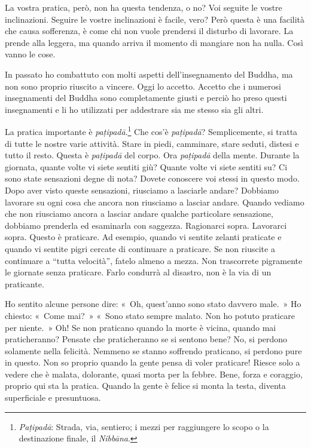 La vostra pratica, però, non ha questa tendenza, o no? Voi seguite le
vostre inclinazioni. Seguire le vostre inclinazioni è facile, vero? Però
questa è una facilità che causa sofferenza, è come chi non vuole
prendersi il disturbo di lavorare. La prende alla leggera, ma quando
arriva il momento di mangiare non ha nulla. Così vanno le cose.

In passato ho combattuto con molti aspetti dell'insegnamento del Buddha,
ma non sono proprio riuscito a vincere. Oggi lo accetto. Accetto che i
numerosi insegnamenti del Buddha sono completamente giusti e perciò ho
preso questi insegnamenti e li ho utilizzati per addestrare sia me
stesso sia gli altri.

La pratica importante è \emph{paṭipadā}.\footnote{\emph{Paṭipadā}:
  Strada, via, sentiero; i mezzi per raggiungere lo scopo o la
  destinazione finale, il \emph{Nibbāna}.} Che cos'è \emph{paṭipadā}?
Semplicemente, si tratta di tutte le nostre varie attività. Stare in
piedi, camminare, stare seduti, distesi e tutto il resto. Questa è
\emph{paṭipadā} del corpo. Ora \emph{paṭipadā} della mente. Durante la
giornata, quante volte vi siete sentiti giù? Quante volte vi siete
sentiti su? Ci sono state sensazioni degne di nota? Dovete conoscere voi
stessi in questo modo. Dopo aver visto queste sensazioni, riusciamo a
lasciarle andare? Dobbiamo lavorare su ogni cosa che ancora non
riusciamo a lasciar andare. Quando vediamo che non riusciamo ancora a
lasciar andare qualche particolare sensazione, dobbiamo prenderla ed
esaminarla con saggezza. Ragionarci sopra. Lavorarci sopra. Questo è
praticare. Ad esempio, quando vi sentite zelanti praticate e quando vi
sentite pigri cercate di continuare a praticare. Se non riuscite a
continuare a ``tutta velocità'', fatelo almeno a mezza. Non trascorrete
pigramente le giornate senza praticare. Farlo condurrà al disastro, non
è la via di un praticante.

Ho sentito alcune persone dire: «~Oh, quest'anno sono stato davvero
male.~» Ho chiesto: «~Come mai?~» «~Sono stato sempre malato. Non ho
potuto praticare per niente.~» Oh! Se non praticano quando la morte è
vicina, quando mai praticheranno? Pensate che praticheranno se si
sentono bene? No, si perdono solamente nella felicità. Nemmeno se stanno
soffrendo praticano, si perdono pure in questo. Non so proprio quando la
gente pensa di voler praticare! Riesce solo a vedere che è malata,
dolorante, quasi morta per la febbre. Bene, forza e coraggio, proprio
qui sta la pratica. Quando la gente è felice si monta la testa, diventa
superficiale e presuntuosa.

